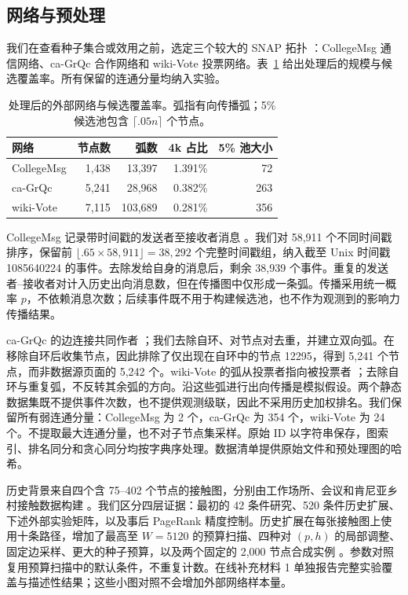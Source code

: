 \documentclass[smallextended]{svjour3}
\begin{document}
\subsection{网络与预处理}
我们在查看种子集合或效用之前，选定三个较大的 SNAP 拓扑 \cite{snap}：CollegeMsg 通信网络、ca-GrQc 合作网络和 wiki-Vote 投票网络。表~\ref{tab:data} 给出处理后的规模与候选覆盖率。所有保留的连通分量均纳入实验。
\begin{table}[htbp]
\caption{处理后的外部网络与候选覆盖率。弧指有向传播弧；5\% 候选池包含 $\lceil .05n\rceil$ 个节点。}\label{tab:data}
\begin{tabular}{lrrrr}
\toprule
网络 & 节点数 & 弧数 & 4k 占比 & 5\% 池大小 \\
\midrule
CollegeMsg & 1,438 & 13,397 & 1.391\% & 72 \\
ca-GrQc & 5,241 & 28,968 & 0.382\% & 263 \\
wiki-Vote & 7,115 & 103,689 & 0.281\% & 356 \\
\bottomrule
\end{tabular}
\end{table}

CollegeMsg 记录带时间戳的发送者至接收者消息 \cite{college}。我们对 58,911 个不同时间戳排序，保留前 $\lfloor .65\times58,911\rfloor=38,292$ 个完整时间戳组，纳入截至 Unix 时间戳 1085640224 的事件。去除发给自身的消息后，剩余 38,939 个事件。重复的发送者--接收者对计入历史出向消息数，但在传播图中仅形成一条弧。传播采用统一概率 $p$，不依赖消息次数；后续事件既不用于构建候选池，也不作为观测到的影响力传播结果。

ca-GrQc 的边连接共同作者 \cite{grqc}；我们去除自环、对节点对去重，并建立双向弧。在移除自环后收集节点，因此排除了仅出现在自环中的节点 12295，得到 5,241 个节点，而非数据源页面的 5,242 个。wiki-Vote 的弧从投票者指向被投票者 \cite{signed,links}；去除自环与重复弧，不反转其余弧的方向。沿这些弧进行出向传播是模拟假设。两个静态数据集既不提供事件次数，也不提供观测级联，因此不采用历史加权排名。我们保留所有弱连通分量：CollegeMsg 为 2 个，ca-GrQc 为 354 个，wiki-Vote 为 24 个。不提取最大连通分量，也不对子节点集采样。原始 ID 以字符串保存，图索引、排名同分和贪心同分均按字典序处理。数据清单提供原始文件和预处理图的哈希。

历史背景来自四个含 75--402 个节点的接触图，分别由工作场所、会议和肯尼亚乡村接触数据构建 \cite{ref3,ref4,ref5,ref6}。我们区分四层证据：最初的 42 条件研究、520 条件历史扩展、下述外部实验矩阵，以及事后 PageRank 精度控制。历史扩展在每张接触图上使用十条路径，增加了最高至 $W=5120$ 的预算扫描、四种对 $(p,h)$ 的局部调整、固定边采样、更大的种子预算，以及两个固定的 2,000 节点合成实例 \cite{ref17,ref18}。参数对照复用预算扫描中的默认条件，不重复计数。在线补充材料 1 单独报告完整实验覆盖与描述性结果；这些小图对照不会增加外部网络样本量。
\end{document}
